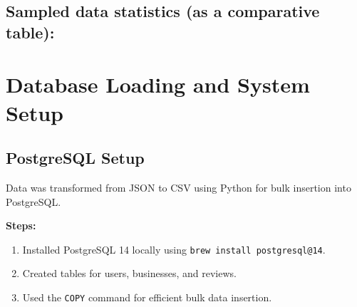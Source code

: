\documentclass[12pt]{article}
\begin{document}
\subsection{Sampled data statistics (as a comparative table):}


\section{Database Loading and System Setup}

\subsection*{PostgreSQL Setup}
Data was transformed from JSON to CSV using Python for bulk insertion into PostgreSQL.

\textbf{Steps:}
\begin{enumerate}
    \item Installed PostgreSQL 14 locally using \texttt{brew install postgresql@14}.
    \item Created tables for users, businesses, and reviews.
    \item Used the \texttt{COPY} command for efficient bulk data insertion.
\end{enumerate}
\end{document}
